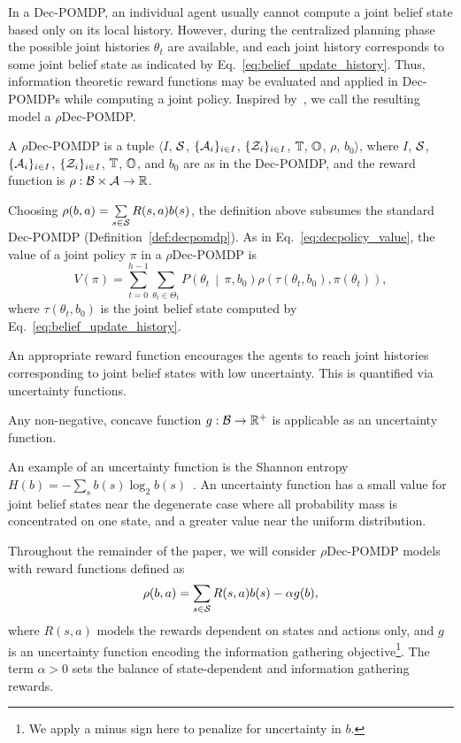 In a Dec-POMDP, an individual agent usually cannot compute a joint belief state  based only on its local history.
However, during the centralized planning phase the possible joint histories $\theta_t$ are available, and each joint history corresponds to some joint belief state as indicated by Eq.~\eqref{eq:belief_update_history}.
Thus, information theoretic reward functions may be evaluated and applied in Dec-POMDPs while computing a joint policy.
Inspired by~\cite{Araya2010}, we call the resulting model a $\rho$Dec-POMDP.
\begin{definition}
\label{def:rhodecpomdp}
A $\rho$Dec-POMDP is a tuple $\langle I$, $\mathcal{S}$, $\lbrace \mathcal{A}_i \rbrace_{i\in I}$, $\lbrace \mathcal{Z}_i \rbrace_{i\in I}$, $\mathbb{T}$, $\mathbb{O}$, $\rho$, $b_0 \rangle$, where $I$, $\mathcal{S}$, $\lbrace \mathcal{A}_i \rbrace_{i\in I}$, $\lbrace \mathcal{Z}_i \rbrace_{i\in I}$, $\mathbb{T}$, $\mathbb{O}$, and $b_0$ are as in the Dec-POMDP, and the reward function is $\rho:\mathcal{B}\times\mathcal{A}\to\mathbb{R}$.
\end{definition}
Choosing $\rho(b,a) = \sum\limits_{s\in\mathcal{S}}R(s,a)b(s)$, the definition above subsumes the standard Dec-POMDP (Definition~\ref{def:decpomdp}).
As in Eq.~\eqref{eq:decpolicy_value}, the value of a joint policy $\pi$ in a $\rho$Dec-POMDP is 
\begin{equation}
\label{eq:rhodecpolicy_value}
V(\pi) = \sum\limits_{t=0}^{h-1}\sum\limits_{\theta_t \in \Theta_t} P\left(\theta_t \,\middle|\, \pi, b_0 \right) \rho( \tau(\theta_t, b_0), \pi(\theta_t)),
\end{equation}
where $\tau(\theta_t, b_0)$ is the joint belief state computed by Eq.~\eqref{eq:belief_update_history}.

An appropriate reward function encourages the agents to reach joint histories corresponding to joint belief states with low uncertainty.
This is quantified via uncertainty functions.
\begin{definition}
Any non-negative, concave function $g:\mathcal{B}\to\mathbb{R}^+$ is applicable as an uncertainty function.
\end{definition}
An example of an uncertainty function is the Shannon entropy $H(b) = -\sum\limits_{s}b(s) \log_2 b(s)$~\cite{Cover2006}.
An uncertainty function has a small value for joint belief states near the degenerate case where all probability mass is concentrated on one state, and a greater value near the uniform distribution.

Throughout the remainder of the paper, we will consider $\rho$Dec-POMDP models with reward functions defined as
\begin{equation}
\label{eq:rhoreward}
\rho(b,a) = \sum\limits_{s\in\St}R(s,a)b(s) -\alpha g(b),
\end{equation}
where $R(s,a)$ models the rewards dependent on states and actions only, and $g$ is an uncertainty function encoding the information gathering objective\footnote{We apply a minus sign here to penalize for uncertainty in $b$.}.
The term $\alpha > 0$ sets the balance of state-dependent and information gathering rewards.

